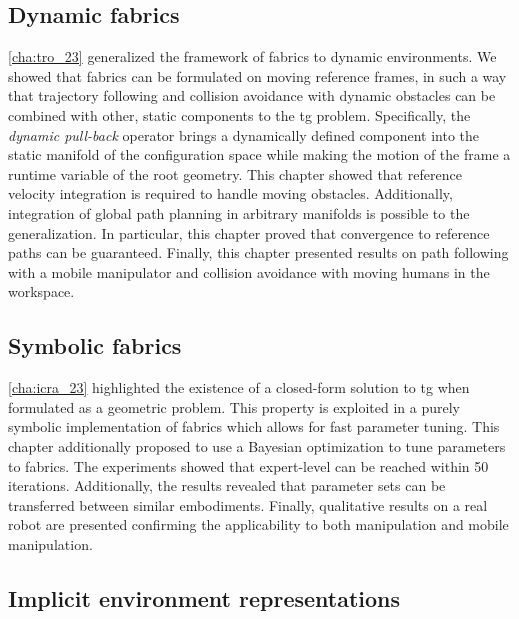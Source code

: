 \subsection{Dynamic fabrics}
\label{sec:conclusion_dynamic_fabrics}

\cref{cha:tro_23} generalized the framework of \ac{fabrics} to dynamic
environments. We showed that \ac{fabrics} can be formulated on moving reference
frames, in such a way that trajectory following and collision avoidance with
dynamic obstacles can be combined with other, static components to the \ac{tg}
problem. Specifically, the \textit{dynamic pull-back}
operator brings a dynamically defined component into the static manifold of the
configuration space while making the motion of the frame a runtime variable of
the root geometry. This chapter showed that reference velocity integration is
required to handle moving obstacles. Additionally, integration of global path
planning in arbitrary manifolds is possible to the generalization. In
particular, this chapter proved that convergence to reference paths can be 
guaranteed. Finally, this chapter presented results on path following with a
mobile manipulator and collision avoidance with moving humans in the workspace.


\subsection{Symbolic fabrics}
\label{sec:conclusion_symbolic_fabrics}

\cref{cha:icra_23} highlighted the existence of a
closed-form solution to \ac{tg} when formulated as a geometric problem.
This property is exploited in a purely symbolic implementation of \ac{fabrics}
which allows for fast parameter tuning. This chapter additionally
proposed to use a Bayesian optimization to tune parameters to \ac{fabrics}.
The experiments showed that expert-level can be reached within 50 iterations.
Additionally, the results revealed that parameter sets can be transferred between
similar embodiments. Finally, qualitative results on a real robot are presented
confirming the applicability to both manipulation and mobile
manipulation.

\subsection{Implicit environment representations}
\label{sec:conclusion_implicit}


